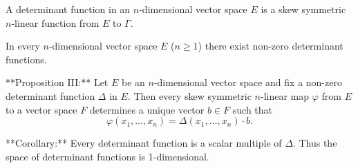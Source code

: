 A determinant function in an $n$-dimensional vector space $E$ is a skew symmetric $n$-linear function from $E$ to $\Gamma$.

In every $n$-dimensional vector space $E$ ($n \geq 1$) there exist non-zero determinant functions.

**Proposition III:** Let $E$ be an $n$-dimensional vector space and fix a non-zero determinant function $\Delta$ in $E$. Then every skew symmetric $n$-linear map $\varphi$ from $E$ to a vector space $F$ determines a unique vector $b \in F$ such that
$$\varphi(x_1, \ldots, x_n) = \Delta(x_1, \ldots, x_n) \cdot b.$$

**Corollary:** Every determinant function is a scalar multiple of $\Delta$. Thus the space of determinant functions is 1-dimensional.
